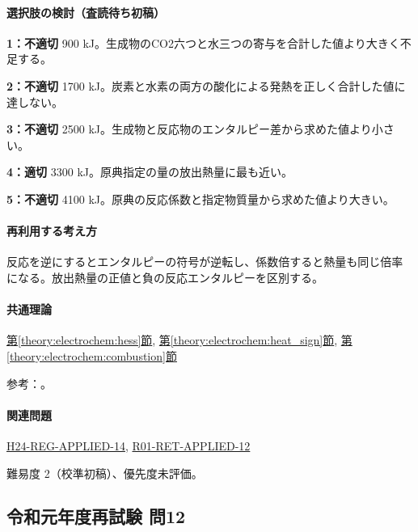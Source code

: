 \paragraph{選択肢の検討（査読待ち初稿）}\mbox{}\par

\noindent\textbf{1：不適切} 900 kJ。生成物のCO2六つと水三つの寄与を合計した値より大きく不足する。\par

\noindent\textbf{2：不適切} 1700 kJ。炭素と水素の両方の酸化による発熱を正しく合計した値に達しない。\par

\noindent\textbf{3：不適切} 2500 kJ。生成物と反応物のエンタルピー差から求めた値より小さい。\par

\noindent\textbf{4：適切} 3300 kJ。原典指定の量の放出熱量に最も近い。\par

\noindent\textbf{5：不適切} 4100 kJ。原典の反応係数と指定物質量から求めた値より大きい。\par

\paragraph{再利用する考え方} 反応を逆にするとエンタルピーの符号が逆転し、係数倍すると熱量も同じ倍率になる。放出熱量の正値と負の反応エンタルピーを区別する。

\paragraph{共通理論} \hyperref[theory:electrochem:hess]{第\ref*{theory:electrochem:hess}節}, \hyperref[theory:electrochem:heat_sign]{第\ref*{theory:electrochem:heat_sign}節}, \hyperref[theory:electrochem:combustion]{第\ref*{theory:electrochem:combustion}節}

\par 参考：\cite{openstax_hess}。

\paragraph{関連問題} \hyperref[q:h24-reg-applied-14]{H24-REG-APPLIED-14}, \hyperref[q:r01-ret-applied-12]{R01-RET-APPLIED-12}

\par 難易度 2（校準初稿）、優先度未評価。

\subsection{令和元年度再試験 問12}
\label{q:r01-ret-applied-12}

